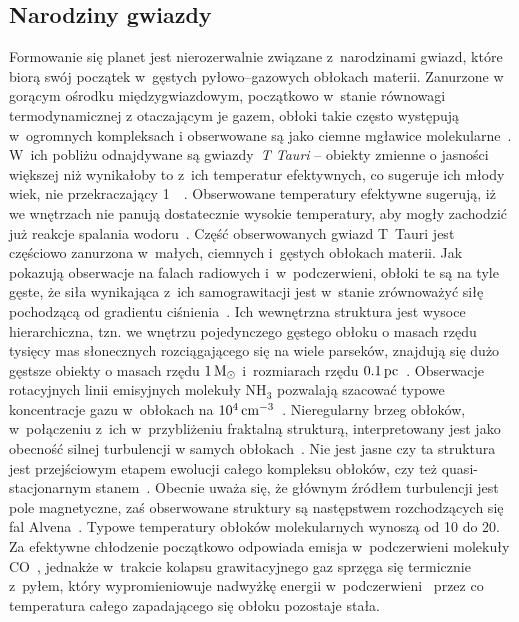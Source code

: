\subsection{Narodziny gwiazdy}
Formowanie się planet jest nierozerwalnie związane z~narodzinami gwiazd, które
biorą swój początek w~gęstych pyłowo--gazowych obłokach materii. Zanurzone w
gorącym ośrodku międzygwiazdowym, początkowo w~stanie równowagi termodynamicznej
z otaczającym je gazem, obłoki takie często występują w~ogromnych kompleksach i
obserwowane są jako ciemne mgławice molekularne~\cite{Tielens05}. W~ich pobliżu
odnajdywane są gwiazdy~\emph{T Tauri} -- obiekty zmienne o jasności większej niż
wynikałoby to z~ich temperatur efektywnych, co sugeruje ich młody wiek, nie
przekraczający 1~\Myr~\cite{H62}. Obserwowane temperatury efektywne sugerują, iż
we wnętrzach nie panują dostatecznie wysokie temperatury, aby mogły zachodzić
już reakcje spalania wodoru~\cite{CK79}. Część obserwowanych gwiazd T~Tauri
jest częściowo zanurzona w~małych, ciemnych i~gęstych obłokach materii. Jak
pokazują obserwacje na falach radiowych i~w~podczerwieni, obłoki te są na tyle
gęste, że siła wynikająca z~ich samograwitacji jest w~stanie zrównoważyć siłę
pochodzącą od gradientu ciśnienia~\cite{WT02}. Ich wewnętrzna struktura jest
wysoce hierarchiczna, tzn. we wnętrzu pojedynczego gęstego obłoku o masach rzędu
tysięcy mas słonecznych rozciągającego się na wiele parseków, znajdują się dużo
gęstsze obiekty o masach rzędu $1\hbox{$\mathrm{\thinspace M_{\odot}}$}$ i~rozmiarach rzędu $0.1\hbox{$\thinspace\textrm{pc}$}$~\cite{M85,
LSM93}. Obserwacje rotacyjnych linii emisyjnych molekuły NH$_3$ pozwalają
szacować typowe koncentracje gazu w~obłokach na $10^{4}\hbox{$\thinspace\textrm{cm}$}^{-3}$~\cite{BM89}.
Nieregularny brzeg obłoków, w~połączeniu z~ich w~przybliżeniu
fraktalną strukturą, interpretowany jest jako obecność silnej turbulencji w
samych obłokach~\cite{E00, FPW91}. Nie jest jasne czy ta struktura jest
przejściowym etapem ewolucji całego kompleksu obłoków, czy też
quasi-stacjonarnym stanem~\cite{L94}. Obecnie uważa się, że głównym źródłem
turbulencji jest pole magnetyczne, zaś obserwowane struktury są następstwem
rozchodzących się fal Alvena~\cite{NP03, MLK04}.
Typowe temperatury obłoków molekularnych wynoszą od 10 do 20\K. Za efektywne
chłodzenie początkowo odpowiada emisja w~podczerwieni molekuły CO~\cite{MSWG82},
jednakże w~trakcie kolapsu grawitacyjnego gaz sprzęga się termicznie z~pyłem,
który wypromieniowuje nadwyżkę energii w~podczerwieni~\cite{HN65, MI00} przez co
temperatura całego zapadającego się obłoku pozostaje stała.

